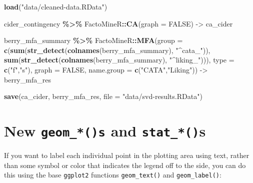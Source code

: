 \documentclass[
]{book}
\newenvironment{Shaded}{\begin{snugshade}}{\end{snugshade}}
\newcommand{\AttributeTok}[1]{\textcolor[rgb]{0.13,0.29,0.53}{#1}}
\newcommand{\ConstantTok}[1]{\textcolor[rgb]{0.56,0.35,0.01}{#1}}
\newcommand{\FunctionTok}[1]{\textcolor[rgb]{0.13,0.29,0.53}{\textbf{#1}}}
\newcommand{\NormalTok}[1]{#1}
\newcommand{\OtherTok}[1]{\textcolor[rgb]{0.56,0.35,0.01}{#1}}
\newcommand{\SpecialCharTok}[1]{\textcolor[rgb]{0.81,0.36,0.00}{\textbf{#1}}}
\newcommand{\StringTok}[1]{\textcolor[rgb]{0.31,0.60,0.02}{#1}}
\begin{document}
\begin{Shaded}
\begin{Highlighting}[]
\FunctionTok{load}\NormalTok{(}\StringTok{"data/cleaned{-}data.RData"}\NormalTok{)}

\NormalTok{cider\_contingency }\SpecialCharTok{\%\textgreater{}\%}
\NormalTok{  FactoMineR}\SpecialCharTok{::}\FunctionTok{CA}\NormalTok{(}\AttributeTok{graph =} \ConstantTok{FALSE}\NormalTok{) }\OtherTok{{-}\textgreater{}}\NormalTok{ ca\_cider}

\NormalTok{berry\_mfa\_summary }\SpecialCharTok{\%\textgreater{}\%}
\NormalTok{  FactoMineR}\SpecialCharTok{::}\FunctionTok{MFA}\NormalTok{(}\AttributeTok{group =} \FunctionTok{c}\NormalTok{(}\FunctionTok{sum}\NormalTok{(}\FunctionTok{str\_detect}\NormalTok{(}\FunctionTok{colnames}\NormalTok{(berry\_mfa\_summary), }\StringTok{"\^{}cata\_"}\NormalTok{)),}
                            \FunctionTok{sum}\NormalTok{(}\FunctionTok{str\_detect}\NormalTok{(}\FunctionTok{colnames}\NormalTok{(berry\_mfa\_summary), }\StringTok{"\^{}liking\_"}\NormalTok{))),}
                  \AttributeTok{type =} \FunctionTok{c}\NormalTok{(}\StringTok{"f"}\NormalTok{,}\StringTok{"s"}\NormalTok{), }\AttributeTok{graph =} \ConstantTok{FALSE}\NormalTok{,}
                  \AttributeTok{name.group =} \FunctionTok{c}\NormalTok{(}\StringTok{"CATA"}\NormalTok{,}\StringTok{"Liking"}\NormalTok{)) }\OtherTok{{-}\textgreater{}}\NormalTok{ berry\_mfa\_res}

\FunctionTok{save}\NormalTok{(ca\_cider,}
\NormalTok{     berry\_mfa\_res,}
     \AttributeTok{file =} \StringTok{"data/svd{-}results.RData"}\NormalTok{)}
\end{Highlighting}
\end{Shaded}

\hypertarget{new-geom_s-and-stat_s}{%
\section{\texorpdfstring{New \texttt{geom\_*()s} and \texttt{stat\_*()}s}{New geom\_*()s and stat\_*()s}}\label{new-geom_s-and-stat_s}}

If you want to label each individual point in the plotting area using text, rather than some symbol or color that indicates the legend off to the side, you can do this using the base \texttt{ggplot2} functions \texttt{geom\_text()} and \texttt{geom\_label()}:
\end{document}
